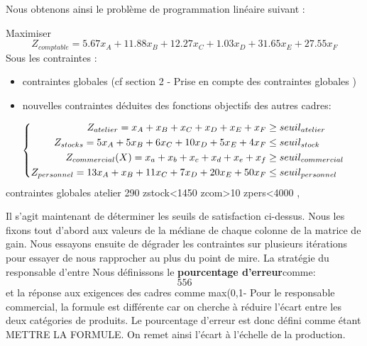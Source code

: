 \documentclass[12pt]{article}
\begin{document}
Nous obtenons ainsi le problème de programmation linéaire suivant :
\begin{tcolorbox}
Maximiser
\begin{equation*}
 Z_{comptable}= 5.67x_{A} +11.88x_{B} +12.27x_{C} +1.03x_{D} +31.65x_{E} +27.55x_{F}
\end{equation*}
Sous les contraintes :
\begin{itemize}
\item contraintes globales (cf section 2 - Prise en compte des contraintes globales )
\item nouvelles contraintes déduites des fonctions objectifs des autres cadres:\\
\end{itemize}

\begin{equation*}
\left\{
\begin{aligned}
   Z_{atelier}= x_{A} + x_{B} + x_{C} + x_{D} + x_{E} + x_{F} &\geq seuil_{atelier}
    \\
   Z_{stocks}= 5x_{A} + 5x_{B} + 6x_{C} + 10x_{D} + 5x_{E} + 4x_{F}
   &\leq seuil_{stock}
   \\
   Z_{commercial}(X)=x_{a} + x_{b} + x_{c} + x_{d} + x_{e} + x_{f} &\geq seuil_{commercial}
   \\
   Z_{personnel}= 13x_{A} + x_{B} + 11x_{C} + 7x_{D} + 20x_{E} + 50x_{F}&\leq seuil_{personnel}
\end{aligned}
\right.
\\
\end{equation*}
contraintes globales
atelier 290
zstock<1450
zcom>10
zpers<4000 ,
\end{tcolorbox}
Il s'agit maintenant de déterminer les seuils de satisfaction ci-dessus. Nous les fixons tout d'abord aux valeurs de la médiane de chaque colonne de la matrice de gain. Nous essayons ensuite de dégrader les contraintes sur plusieurs itérations pour essayer de nous rapprocher au plus du point de mire. La stratégie du responsable d'entre
Nous définissons le \textbf{pourcentage d'erreur}comme:
	\begin{equation*}
		556
	\end{equation*}
et la réponse aux exigences des cadres comme max(0,1-%
Pour le responsable commercial, la formule est différente car on cherche à réduire l’écart entre les deux catégories de produits. Le pourcentage d’erreur est donc défini comme étant METTRE LA FORMULE. On remet ainsi l’écart à l’échelle de la production.
\end{document}
